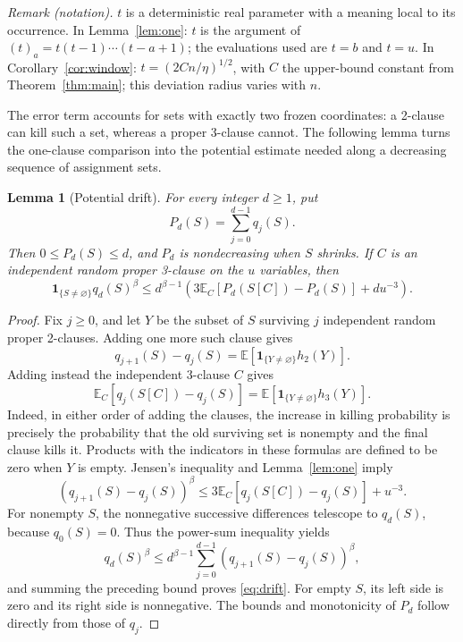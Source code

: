 \documentclass[11pt]{article}
\newtheorem{lemma}[theorem]{Lemma}
\theoremstyle{remark}
\newcommand{\E}{\mathbb E}
\newcommand{\ind}{\mathbf 1}
\numberwithin{equation}{section}
\begin{document}
\noindent\textit{Remark (notation).} $t$ is a deterministic real parameter with a meaning local to its occurrence. In Lemma~\ref{lem:one}: $t$ is the argument of $(t)_a=t(t-1)\cdots(t-a+1)$; the evaluations used are $t=b$ and $t=u$. In Corollary~\ref{cor:window}: $t=(2Cn/\eta)^{1/2}$, with $C$ the upper-bound constant from Theorem~\ref{thm:main}; this deviation radius varies with $n$.


The error term accounts for sets with exactly two frozen coordinates:
a 2-clause can kill such a set, whereas a proper 3-clause cannot.
The following lemma turns the one-clause comparison into the potential
estimate needed along a decreasing sequence of assignment sets.

\begin{lemma}[Potential drift]
\label{lem:potential}
For every integer $d\ge1$, put
\[
 P_d(S)=\sum_{j=0}^{d-1}q_j(S).
\]
Then $0\le P_d(S)\le d$, and $P_d$ is nondecreasing when $S$ shrinks.
If $C$ is an independent random proper 3-clause on the $u$ variables,
then
\begin{equation}
 \ind_{\{S\ne\varnothing\}}q_d(S)^\beta
 \le d^{\beta-1}
 \left(3\E_C[P_d(S[C])-P_d(S)]+du^{-3}\right).
 \label{eq:drift}
\end{equation}
\end{lemma}

\begin{proof}
Fix $j\ge0$, and let $Y$ be the subset of $S$ surviving $j$ independent
random proper 2-clauses. Adding one more such clause gives
\begin{equation}
 q_{j+1}(S)-q_j(S)=\E[\ind_{\{Y\ne\varnothing\}}h_2(Y)].
 \label{eq:two-increment}
\end{equation}
Adding instead the independent 3-clause $C$ gives
\begin{equation}
 \E_C[q_j(S[C])-q_j(S)]
   =\E[\ind_{\{Y\ne\varnothing\}}h_3(Y)].
 \label{eq:three-increment}
\end{equation}
Indeed, in either order of adding the clauses, the increase in killing
probability is precisely the probability that the old surviving set
is nonempty and the final clause kills it. Products with the indicators
in these formulas are defined to be zero when $Y$ is empty.
Jensen's inequality and Lemma~\ref{lem:one} imply
\[
 (q_{j+1}(S)-q_j(S))^\beta
 \le3\E_C[q_j(S[C])-q_j(S)]+u^{-3}.
\]
For nonempty $S$, the nonnegative successive differences telescope to
$q_d(S)$, because $q_0(S)=0$. Thus the power-sum inequality yields
\[
 q_d(S)^\beta
 \le d^{\beta-1}\sum_{j=0}^{d-1}(q_{j+1}(S)-q_j(S))^\beta,
\]
and summing the preceding bound proves \eqref{eq:drift}.
For empty $S$, its left side is zero and its right side is nonnegative.
The bounds and monotonicity of $P_d$ follow directly from those of $q_j$.
\end{proof}
\end{document}
